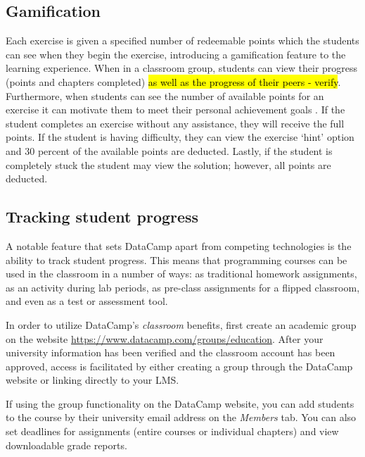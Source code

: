 \documentclass{tise_style_doi}
\begin{document}
\subsection{Gamification}

Each exercise is given a specified number of redeemable points which the students
can see when they begin the exercise, introducing a gamification feature to the learning
experience. When in a classroom group, students can view their progress (points and chapters
completed) \hl{as well as the progress of their peers - verify}. Furthermore, when students
can see the number of available points for an exercise it can motivate them to meet their personal
achievement goals \citep{Chang2016}. If the student completes an exercise without
any assistance, they will receive the full points. If the student is having difficulty, they can
view the exercise `hint' option and 30 percent of the available points are deducted.
Lastly, if the student is completely stuck the student may view the solution; however, all
points are deducted.

\subsection{Tracking student progress}

A notable feature that sets DataCamp apart from competing technologies is the ability
to track student progress. This means that programming courses can be used
in the classroom in a number of ways: as traditional homework assignments, as an activity
during lab periods, as pre-class assignments for a flipped classroom, and even as a
test or assessment tool.

In order to utilize DataCamp's \textit{classroom} benefits, first create an academic
group on the website \url{https://www.datacamp.com/groups/education}. After your
university information has been verified and the classroom account has been approved,
access is facilitated by either creating a group through the DataCamp website or
linking directly to your LMS.

If using the group functionality on the DataCamp website, you can add students to the course
by their university email address on the \textit{Members} tab.  You can also set deadlines
for assignments (entire courses or individual chapters) and view downloadable grade reports.
\end{document}
